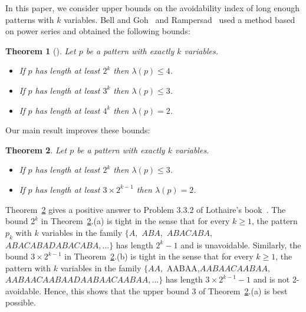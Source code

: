 \documentclass[]{elsart}
\newtheorem{theorem}{Theorem}
\begin{document}
In this paper, we consider upper bounds on the avoidability index of
long enough patterns with $k$ variables. Bell and
Goh~\cite{BellGoh:2007} and Rampersad~\cite{Rampersad:2011} used a
method based on power series and obtained the following bounds:
\begin{theorem}[\cite{BellGoh:2007,Rampersad:2011}]
\label{BGR}
Let $p$ be a pattern with exactly $k$ variables.
\begin{itemize}
\item[(a)] If $p$ has length at least $2^k$ then
 $\lambda(p)\le4$.~\cite{BellGoh:2007}
\item[(b)] If $p$ has length at least $3^k$ then
 $\lambda(p)\le3$.~\cite{Rampersad:2011}
\item[(c)] If $p$ has length at least $4^k$ then
 $\lambda(p)=2$.~\cite{Rampersad:2011}
\end{itemize}
\end{theorem}

Our main result improves these bounds:
\begin{theorem}
\label{2tok}
Let $p$ be a pattern with exactly $k$ variables.
\begin{itemize}
\item[(a)] If $p$ has length at least $2^k$ then $\lambda(p)\le3$.
\item[(b)] If $p$ has length at least $3\times2^{k-1}$ then $\lambda(p)=2$.
\end{itemize}
\end{theorem}

Theorem~\ref{2tok} gives a positive answer to Problem 3.3.2 of
Lothaire's book~\cite{Lothaire:2002}. The bound $2^k$ in
Theorem~\ref{2tok}.(a) is tight in the sense that for every $k\ge 1$,
the pattern $p_k$ with $k$ variables in the family
$\{A,$ $ABA,$ $ABACABA,$ $ABACABADABACABA,\dots\}$ has length $2^k-1$ and is
unavoidable. Similarly, the bound $3\times2^{k-1}$ in
Theorem~\ref{2tok}.(b) is tight in the sense that
for every $k\ge 1$, the pattern with $k$ variables in the family
$\{AA,$ AABAA,$ AABAACAABAA,$ $AABAACAABAADAABAACAABAA,\dots\}$ has length
$3\times2^{k-1}-1$ and is not 2-avoidable. Hence, this
shows that the upper bound 3 of Theorem~\ref{2tok}.(a) is best possible.\\
\end{document}
